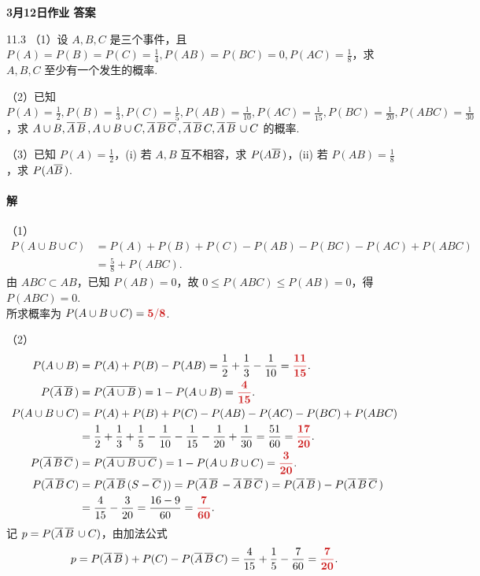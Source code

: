 \documentclass[11pt, UTF8]{ctexart}
\newcommand{\hwdate}{3月12日}
\newcommand{\Prob}{P}
\newcommand{\comp}[1]{\overline{#1}\mskip 3mu}
\newcommand{\ans}[1]{\mathbf{\color{fred}#1}}
\begin{document}
\begin{center}
    {\LARGE \bfseries \color{fblue} \hwdate 作业 答案}
\end{center}

\begin{problem}{1}{1.3}
（1）设 $A, B, C$ 是三个事件，且 $\Prob(A)=\Prob(B)=\Prob(C)=\frac{1}{4}, \Prob(AB)=\Prob(BC)=0, \Prob(AC)=\frac{1}{8}$，求 $A, B, C$ 至少有一个发生的概率.

（2）已知 $\Prob(A)=\frac{1}{2}, \Prob(B)=\frac{1}{3}, \Prob(C)=\frac{1}{5}, \Prob(AB)=\frac{1}{10}, \Prob(AC)=\frac{1}{15}, \Prob(BC)=\frac{1}{20}, \Prob(ABC)=\frac{1}{30}$，求 $A \cup B, \comp{A}\comp{B}, A \cup B \cup C, \comp{A}\comp{B}\comp{C}, \comp{A}\comp{B}C, \comp{A}\comp{B} \cup C$ 的概率.

（3）已知 $\Prob(A)=\frac{1}{2}$，(i) 若 $A, B$ 互不相容，求 $\Prob(A\comp{B})$，(ii) 若 $\Prob(AB)=\frac{1}{8}$，求 $\Prob(A\comp{B})$.
\end{problem}

\paragraph{\color{fblue}解} 
（1）
\begin{align*}
    \Prob(A \cup B \cup C) &= \Prob(A)+\Prob(B)+\Prob(C)-\Prob(AB)-\Prob(BC)-\Prob(AC)+\Prob(ABC) \\
    &= \frac{5}{8}+\Prob(ABC).
\end{align*}
由 $ABC \subset AB$，已知 $\Prob(AB)=0$，故 $0 \leqslant \Prob(ABC) \leqslant \Prob(AB)=0$，得 $\Prob(ABC)=0$. \\
所求概率为 $\Prob(A \cup B \cup C) = \ans{5/8}$.

（2）
\begin{align*}
    \Prob(A \cup B) &= \Prob(A)+\Prob(B)-\Prob(AB) = \frac{1}{2}+\frac{1}{3}-\frac{1}{10} = \ans{\frac{11}{15}}.\\
    \Prob(\comp{A}\comp{B}) &= \Prob(\comp{A \cup B}) = 1-\Prob(A \cup B) = \ans{\frac{4}{15}}.\\
    \Prob(A \cup B \cup C) &= \Prob(A)+\Prob(B)+\Prob(C)-\Prob(AB)-\Prob(AC)-\Prob(BC)+\Prob(ABC) \\
    &= \frac{1}{2}+\frac{1}{3}+\frac{1}{5}-\frac{1}{10}-\frac{1}{15}-\frac{1}{20}+\frac{1}{30} = \frac{51}{60} = \ans{\frac{17}{20}}.\\
    \Prob(\comp{A}\comp{B}\comp{C}) &= \Prob(\comp{A \cup B \cup C}) = 1-\Prob(A \cup B \cup C) = \ans{\frac{3}{20}}.\\
        \Prob(\comp{A}\comp{B}C) &= \Prob(\comp{A}\comp{B}(S-\comp{C})) = \Prob(\comp{A}\comp{B}-\comp{A}\comp{B}\comp{C}) = \Prob(\comp{A}\comp{B})-\Prob(\comp{A}\comp{B}\comp{C}) \\
    &= \frac{4}{15}-\frac{3}{20} = \frac{16-9}{60} = \ans{\frac{7}{60}}.
\end{align*}
记 $p=\Prob(\comp{A}\comp{B} \cup C)$，由加法公式
\[ p = \Prob(\comp{A}\comp{B})+\Prob(C)-\Prob(\comp{A}\comp{B}C) = \frac{4}{15}+\frac{1}{5}-\frac{7}{60} = \ans{\frac{7}{20}}. \]
\end{document}
